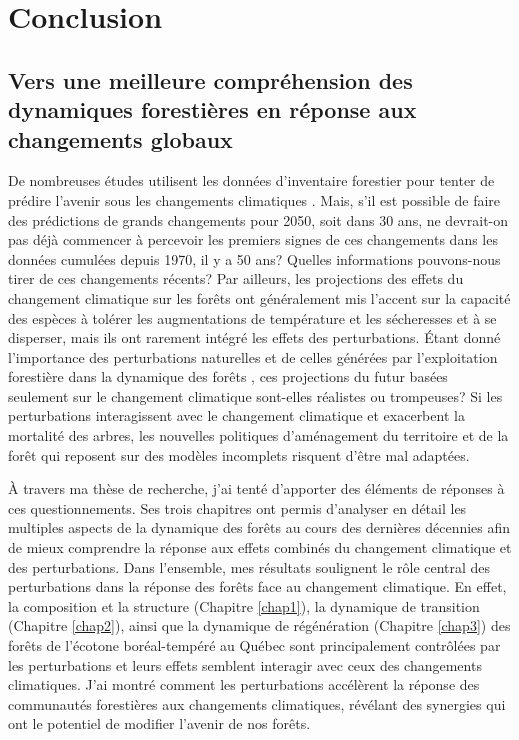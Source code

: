 \francais

\chapter*{Conclusion}

\setcounter{chapter}{4}

\hypertarget{vers-une-meilleure-compruxe9hension-des-dynamiques-forestiuxe8res-en-ruxe9ponse-aux-changements-globaux}{%
\section{Vers une meilleure compréhension des dynamiques forestières en
réponse aux changements
globaux}\label{vers-une-meilleure-compruxe9hension-des-dynamiques-forestiuxe8res-en-ruxe9ponse-aux-changements-globaux}}

De nombreuses études utilisent les données d'inventaire forestier pour
tenter de prédire l'avenir sous les changements climatiques
\citep{boulanger_climate_2017, chen_modeling_2002, iverson_estimating_2008, meier_climate_2012, perie_dominant_2016, vissault_biogeographie_2016}.
Mais, s'il est possible de faire des prédictions de grands changements
pour 2050, soit dans 30 ans, ne devrait-on pas déjà commencer à
percevoir les premiers signes de ces changements dans les données
cumulées depuis 1970, il y a 50 ans? Quelles informations pouvons-nous
tirer de ces changements récents? Par ailleurs, les projections des
effets du changement climatique sur les forêts ont généralement mis
l'accent sur la capacité des espèces à tolérer les augmentations de
température et les sécheresses et à se disperser, mais ils ont rarement
intégré les effets des perturbations. Étant donné l'importance des
perturbations naturelles et de celles générées par l'exploitation
forestière dans la dynamique des forêts \citep{turner_disturbance_2010},
ces projections du futur basées seulement sur le changement climatique
sont-elles réalistes ou trompeuses? Si les perturbations interagissent
avec le changement climatique et exacerbent la mortalité des arbres, les
nouvelles politiques d'aménagement du territoire et de la forêt qui
reposent sur des modèles incomplets risquent d'être mal adaptées.

À travers ma thèse de recherche, j'ai tenté d'apporter des éléments de
réponses à ces questionnements. Ses trois chapitres ont permis
d'analyser en détail les multiples aspects de la dynamique des forêts au
cours des dernières décennies afin de mieux comprendre la réponse aux
effets combinés du changement climatique et des perturbations. Dans
l'ensemble, mes résultats soulignent le rôle central des perturbations
dans la réponse des forêts face au changement climatique. En effet, la
composition et la structure (Chapitre \ref{chap1}), la dynamique de
transition (Chapitre \ref{chap2}), ainsi que la dynamique de
régénération (Chapitre \ref{chap3}) des forêts de l'écotone
boréal-tempéré au Québec sont principalement contrôlées par les
perturbations et leurs effets semblent interagir avec ceux des
changements climatiques. J'ai montré comment les perturbations
accélèrent la réponse des communautés forestières aux changements
climatiques, révélant des synergies qui ont le potentiel de modifier
l'avenir de nos forêts.

